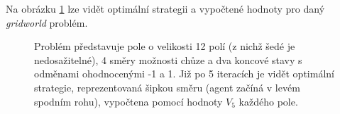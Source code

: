 Na obrázku \ref{img:policy} lze vidět optimální strategii a vypočtené hodnoty pro daný \textit{gridworld} problém.

\begin{figure}[!htbp]
\begin{center}
	\caption{Problém představuje pole o velikosti 12 polí (z nichž šedé je nedosažitelné), 4 směry možnosti chůze a dva koncové stavy s odměnami ohodnocenými -1 a 1. Již po 5 iteracích je vidět optimální strategie, reprezentovaná šipkou směru (agent začíná v levém spodním rohu), vypočtena pomocí hodnoty $V_{5}$ každého pole.}
	\label{img:policy}
\end{center}
\end{figure}

